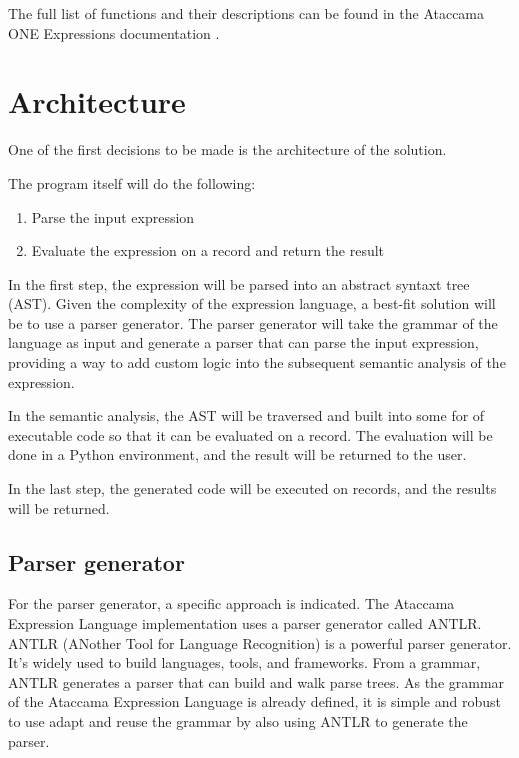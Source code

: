    The full list of functions and their descriptions can be found in the Ataccama ONE Expressions documentation \cite{one_expressions}.


\section{Architecture}

One of the first decisions to be made is the architecture of the solution.

The program itself will do the following:

\begin{enumerate}
    \item Parse the input expression
    \item Evaluate the expression on a record and return the result
\end{enumerate}

In the first step, the expression will be parsed into an abstract syntaxt tree (AST). Given the complexity of the expression language, a best-fit solution will be to use a parser generator. The parser generator will take the grammar of the language as input and generate a parser that can parse the input expression, providing a way to add custom logic into the subsequent semantic analysis of the expression.

In the semantic analysis, the AST will be traversed and built into some for of executable code so that it can be evaluated on a record. The evaluation will be done in a Python environment, and the result will be returned to the user.

In the last step, the generated code will be executed on records, and the results will be returned.

\subsection{Parser generator}

For the parser generator, a specific approach is indicated. The Ataccama Expression Language implementation uses a parser generator called ANTLR. ANTLR (ANother Tool for Language Recognition) is a powerful parser generator\cite{antlr}. It's widely used to build languages, tools, and frameworks. From a grammar, ANTLR generates a parser that can build and walk parse trees\cite{antlr4docs}. As the grammar of the Ataccama Expression Language is already defined, it is simple and robust to use adapt and reuse the grammar by also using ANTLR to generate the parser. 

